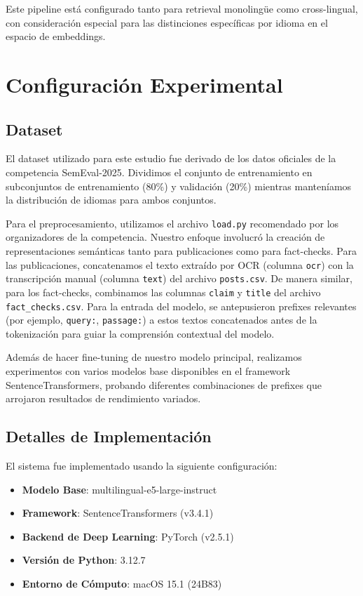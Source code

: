 \documentclass[11pt]{article}
\begin{document}
Este pipeline está configurado tanto para retrieval monolingüe como cross-lingual, con consideración especial para las distinciones específicas por idioma en el espacio de embeddings.

\section{Configuración Experimental}

\subsection{Dataset}

El dataset utilizado para este estudio fue derivado de los datos oficiales de la competencia SemEval-2025. Dividimos el conjunto de entrenamiento en subconjuntos de entrenamiento (80\%) y validación (20\%) mientras manteníamos la distribución de idiomas para ambos conjuntos.

Para el preprocesamiento, utilizamos el archivo \texttt{load.py} recomendado por los organizadores de la competencia. Nuestro enfoque involucró la creación de representaciones semánticas tanto para publicaciones como para fact-checks. Para las publicaciones, concatenamos el texto extraído por OCR (columna \texttt{ocr}) con la transcripción manual (columna \texttt{text}) del archivo \texttt{posts.csv}. De manera similar, para los fact-checks, combinamos las columnas \texttt{claim} y \texttt{title} del archivo \texttt{fact\_checks.csv}. Para la entrada del modelo, se antepusieron prefixes relevantes (por ejemplo, \texttt{query:}, \texttt{passage:}) a estos textos concatenados antes de la tokenización para guiar la comprensión contextual del modelo.

Además de hacer fine-tuning de nuestro modelo principal, realizamos experimentos con varios modelos base disponibles en el framework SentenceTransformers, probando diferentes combinaciones de prefixes que arrojaron resultados de rendimiento variados.

\subsection{Detalles de Implementación}

El sistema fue implementado usando la siguiente configuración:

\begin{itemize}
    \item \textbf{Modelo Base}: multilingual-e5-large-instruct
    \item \textbf{Framework}: SentenceTransformers (v3.4.1)
    \item \textbf{Backend de Deep Learning}: PyTorch (v2.5.1)
    \item \textbf{Versión de Python}: 3.12.7
    \item \textbf{Entorno de Cómputo}: macOS 15.1 (24B83)
\end{itemize}
\end{document}
